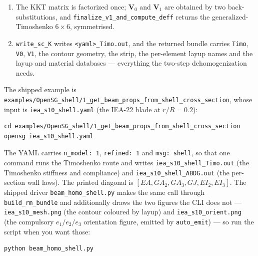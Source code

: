 \begin{enumerate}
      multiplier enforcing the drilling constraint, and MITC tying of
      $\gamma_{23}$ only. (Under span invariance $\gamma_{13}$ is algebraic in
      the directors and carries no fluctuation gradient, so only $\gamma_{23}$
      pairs a differentiated displacement with a rotation.) The six energy
      blocks \texttt{Dhh, Dhe, Dee, Dhl, Dll, Dle} come out of
      \texttt{assemble\_segment\_indep} and the drilling rows
      \texttt{Gc, Gl, Ge} out of \texttt{assemble\_constraint}; all are divided
      by the artificial strip depth $h$.
\item The KKT matrix is factorized once; $\mathbf{V}_0$ and $\mathbf{V}_1$ are
      obtained by two back-substitutions, and
      \texttt{finalize\_v1\_and\_compute\_deff} returns the generalized-Timoshenko
      $6\times6$, symmetrised.
\item \texttt{write\_sc\_K} writes \texttt{<yaml>\_Timo.out}, and the returned
      bundle carries \texttt{Timo}, \texttt{V0}, \texttt{V1}, the contour
      geometry, the strip, the per-element layup names and the layup and
      material databases --- everything the two-step dehomogenization needs.
\end{enumerate}

The shipped example is
\texttt{examples/OpenSG\_shell/1\_get\_beam\_props\_from\_shell\_cross\_section},
whose input is \texttt{iea\_s10\_shell.yaml} (the IEA-22 blade at $r/R=0.2$):

\begin{lstlisting}[style=shellst]
cd examples/OpenSG_shell/1_get_beam_props_from_shell_cross_section
opensg iea_s10_shell.yaml
\end{lstlisting}

\noindent
The YAML carries \texttt{n\_model: 1}, \texttt{refined: 1} and
\texttt{msg: shell}, so that one command runs the Timoshenko route and writes
\texttt{iea\_s10\_shell\_Timo.out} (the Timoshenko stiffness and compliance)
and \texttt{iea\_s10\_shell\_ABDG.out} (the per-section wall laws). The
printed diagonal is $[EA, GA_2, GA_3, GJ, EI_2, EI_3]$. The shipped driver
\texttt{beam\_homo\_shell.py} makes the same call through
\texttt{build\_rm\_bundle} and additionally draws the two figures the CLI
does not --- \texttt{iea\_s10\_mesh.png} (the contour coloured by layup) and
\texttt{iea\_s10\_orient.png} (the compulsory $e_1/e_2/e_3$ orientation
figure, emitted by \texttt{auto\_emit}) --- so run the script when you want
those:

\begin{lstlisting}[style=shellst]
python beam_homo_shell.py
\end{lstlisting}

